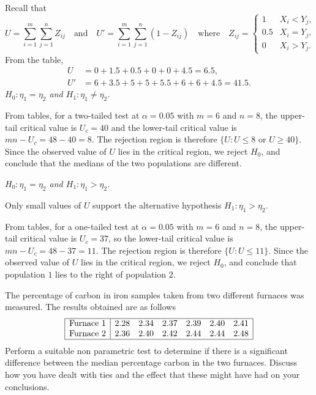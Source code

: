 \begin{exercise}
\begin{questions}
\begin{answer}
Recall that 
\[
U = \sum_{i=1}^m \sum_{j=1}^n Z_{ij} 
\quad\text{and}\quad 
U' = \sum_{i=1}^m \sum_{j=1}^n (1-Z_{ij}) 
\quad\text{where}\quad 
Z_{ij} = \begin{cases} 
	1 	& X_i < Y_j, \\
	0.5	& X_i = Y_j, \\
	0	& X_i > Y_j.
\end{cases}
\]
From the table,
\begin{align*}
U 	& = 0 + 1.5 + 0.5 + 0 + 0 + 4.5 = 6.5, \\
U'	& = 6 + 3.5 + 5 + 5 + 5.5 + 6 + 6 + 4.5 = 41.5.
\end{align*}
\ben
\it $H_0:\eta_1=\eta_2$ and $H_1:\eta_1\neq\eta_2$. 
\par 
From tables, for a two-tailed test at $\alpha=0.05$ with $m=6$ and $n=8$, the upper-tail critical value is $U_c=40$ and the lower-tail critical value is $mn-U_c = 48-40=8$. The rejection region is therefore $\{U:U\leq 8\text{ or }U\geq 40\}$. Since the observed value of $U$ lies in the critical region, we reject $H_0$, and conclude that the medians of the two populations are different.

\it $H_0:\eta_1=\eta_2$ and $H_1:\eta_1>\eta_2$. 
\par 
Only small values of $U$ support the alternative hypothesis $H_1:\eta_1>\eta_2$. 
\par
From tables, for a one-tailed test at $\alpha=0.05$ with $m=6$ and $n=8$, the upper-tail critical value is $U_c=37$, so the lower-tail critical value is $mn-U_c = 48-37=11$. The rejection region is therefore $\{U:U\leq 11\}$. Since the observed value of $U$ lies in the critical region, we reject $H_0$, and conclude that population $1$ lies to the right of population $2$.
\een
\end{answer}

\question
The percentage of carbon in iron samples taken from two different furnaces was measured. The results obtained are as follows
\[\begin{array}{|c|cccccc|} \hline
\text{Furnace $1$} 	& 2.28    & 2.34    & 2.37    & 2.39    & 2.40    & 2.41 \\
\text{Furnace $2$}	& 2.36    & 2.40    & 2.42    & 2.44    & 2.44    & 2.48 \\ \hline
\end{array}\]
Perform a suitable non parametric test to determine if there is a significant difference between the median percentage carbon in the two furnaces. Discuss how you have dealt with ties and the effect that these might have had on your conclusions.          


\end{questions}
\end{exercise}
